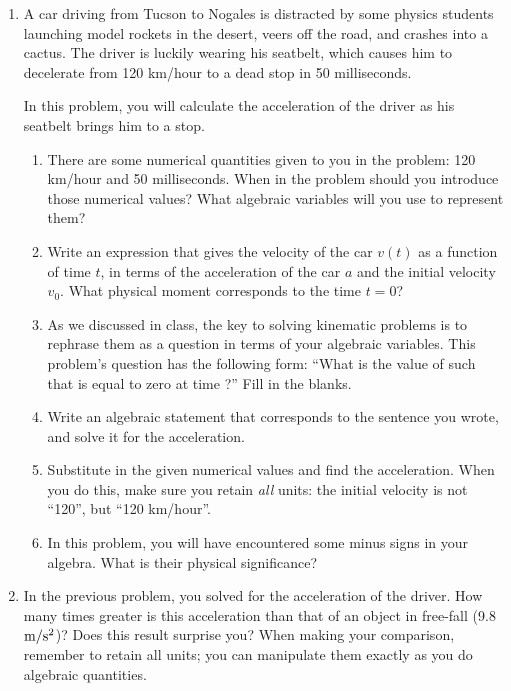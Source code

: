 \documentclass[12pt]{article}
\begin{document}
\begin{enumerate}

\item A car driving from Tucson to Nogales is distracted by some physics students launching model rockets in the desert, veers off the road, and crashes into a cactus. The driver is luckily wearing his seatbelt, which causes him to decelerate from 120 km/hour to a dead stop in 50 milliseconds.

\medskip

In this problem, you will calculate the acceleration of the driver as his seatbelt brings him to a stop.

\bigskip
\bigskip

\begin{enumerate}
\item{There are some numerical quantities given to you in the problem: 120 km/hour and 50 milliseconds. 
When in the problem should you introduce those numerical values? What algebraic variables will you use to 
represent them?}
\item{Write an expression that gives the velocity of the car $v(t)$ as a function of time $t$, in terms of the 
acceleration of the car $a$ and the initial velocity $v_0$. What physical moment corresponds to the time $t=0$?}
\item{As we discussed in class, the key to solving kinematic problems is to rephrase them as a question in terms
of your algebraic variables. This problem's question has the following form: ``What is the value of \underline{\hspace{1cm}} such that \underline{\hspace{1cm}} is equal to zero at time \underline{\hspace{1cm}}?'' Fill in
the blanks.}
\item{Write an algebraic statement that corresponds to the sentence you wrote, and solve it for the acceleration.}
\item{Substitute in the given numerical values and find the acceleration. When you do this, make sure you
retain {\it all} units: the initial velocity is not ``120'', but ``120 km/hour''.}
\item{In this problem, you will have encountered some minus signs in your algebra. What is their physical significance?}
\end{enumerate}


\bigskip
\bigskip

\item In the previous problem, you solved for the acceleration of the driver. How many times greater is this
acceleration than that of an object in free-fall (9.8 $\rm m/\rm s^2$)? Does this result surprise you? When making your comparison, remember to retain all units;
you can manipulate them exactly as you do algebraic quantities.


\end{enumerate}
\end{document}
